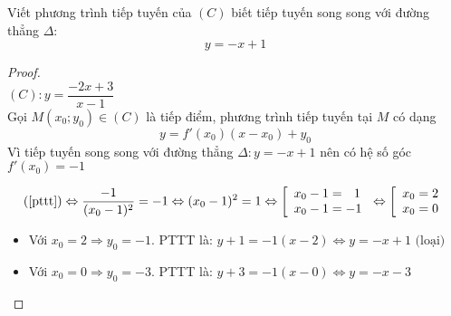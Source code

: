\begin{dl}
	Viết phương trình tiếp tuyến của $(C)$ biết tiếp tuyến song song với đường thẳng $\Delta:$ $$y=-x+1$$
\end{dl}
\begin{proof}~\\[8pt]
	$(C): y=\dfrac{-2x+3}{x-1}$\\[8pt]
	Gọi $M(x_0;y_0)\in(C)$ là tiếp điểm, phương trình tiếp tuyến tại $M$ có dạng \begin{equation}\label{pttt}
	y=f'(x_0)(x-x_0)+y_0
	\end{equation}
	Vì tiếp tuyến song song với đường thẳng $\Delta: y=-x+1$ nên có hệ số góc $f'(x_0)=-1$

	$$(\ref{pttt})\Leftrightarrow \frac{-1}{(x_0-1)^2}=-1\Leftrightarrow (x_0-1)^2=1\Leftrightarrow \left[\begin{array}{l}
	x_0-1=~~1\\x_0-1=-1
	\end{array}\right.\Leftrightarrow
	\left[\begin{array}{l}
	x_0=2\\x_0=0
	\end{array}\right.$$
	\begin{itemize}
		\item Với $x_0=2\Rightarrow y_0=-1$. PTTT là: $y+1=-1(x-2)\Leftrightarrow y=-x+1 \mbox{ (loại)}$
		
		\item Với $x_0=0\Rightarrow y_0=-3$. PTTT là: $y+3=-1(x-0)\Leftrightarrow y=-x-3$
	\end{itemize}
\end{proof}

